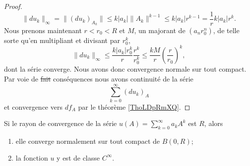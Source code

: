 \begin{proof}
\begin{equation}
        \| du_k \|_{\infty}=\| (du_k)_{A_k} \|\leq k| a_k |\| A_k \|^{k-1}\leq  k| a_k |r^{k-1}=\frac{1}{ r }k| a_k |r^k.
    \end{equation}
    Nous prenons maintenant \( r<r_0<R\) et \( M\), un majorant de \( (a_nr_0^n)\), de telle sorte qu'en multipliant et divisant par \( r_0^k\),
    \begin{equation}
        \| du_k \|_{\infty}\leq \frac{ k| a_k |r_0^k }{ r }\frac{ r^k }{ r_0^k }\leq \frac{ kM }{ r }\left( \frac{ r }{ r_0 } \right)^k,
    \end{equation}
    dont la série converge. Nous avons donc convergence normale sur tout compact. Par voie de \sout{fait} conséquences nous avons continuité de la série
    \begin{equation}
        \sum_{k=0}^{\infty}(du_k)_A
    \end{equation}
    et convergence vers \( df_A\) par le théorème \ref{ThoLDpRmXQ}.
\end{proof}

\begin{proposition} \label{PropQIIURAh}
    Si le rayon de convergence de la série \( u(A)=\sum_{k=0}^{\infty}a_kA^k\) est \( R\), alors 
    \begin{enumerate}
        \item
            elle converge normalement sur tout compact de \( B(0,R)\);
        \item
            la fonction \( u\) y est de classe \(  C^{\infty}\).
    \end{enumerate}
\end{proposition}


